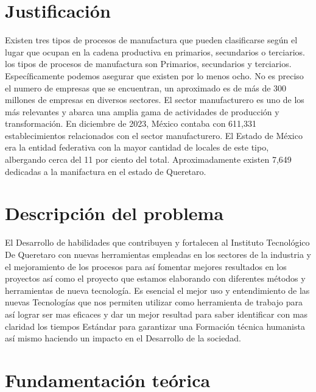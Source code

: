    \section{Justificación}
    Existen tres tipos de procesos de manufactura que pueden clasificarse según el lugar que ocupan en la cadena productiva en primarios, secundarios o terciarios. los tipos de procesos de manufactura son Primarios, secundarios y terciarios. Específicamente podemos asegurar que existen por lo menos ocho.
    No es preciso el numero de empresas que se encuentran, un aproximado es de más de 300 millones de empresas en diversos sectores. El sector manufacturero es uno de los más relevantes y abarca una amplia gama de actividades de producción y transformación.
    En diciembre de 2023, México contaba con 611,331 establecimientos relacionados con el sector manufacturero. El Estado de México era la entidad federativa con la mayor cantidad de locales de este tipo, albergando cerca del 11 por ciento del total.
    Aproximadamente existen 7,649 dedicadas a la manifactura en el estado de Queretaro. 
         
    \section{Descripción del problema}
    
    El Desarrollo de habilidades  que contribuyen y fortalecen al Instituto Tecnológico De Queretaro con nuevas herramientas empleadas en los sectores de la industria y el mejoramiento de los procesos para así fomentar mejores resultados en los proyectos así como el proyecto que estamos elaborando con diferentes métodos y herramientas de nueva tecnología.  
    Es esencial el  mejor uso y entendimiento de las nuevas Tecnologías que nos permiten utilizar como herramienta de trabajo para así lograr ser mas eficaces y dar un mejor resultad para saber identificar con mas claridad los tiempos Estándar para garantizar una Formación técnica humanista así mismo haciendo un impacto en el Desarrollo de la sociedad. 
        
    \section{Fundamentación teórica}
    
